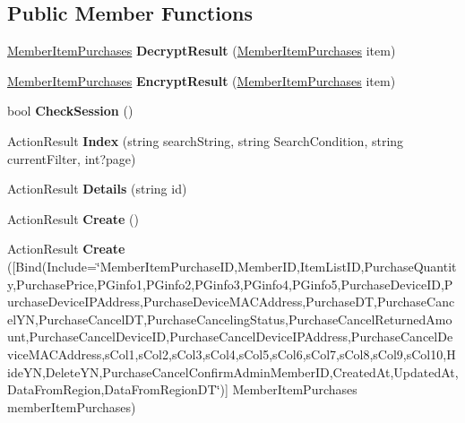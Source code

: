 \subsection*{Public Member Functions}
\begin{DoxyCompactItemize}
\item 
\hyperlink{a00141}{Member\+Item\+Purchases} {\bfseries Decrypt\+Result} (\hyperlink{a00141}{Member\+Item\+Purchases} item)\hypertarget{a00142_a8a84f0cff554dfb46c0c604d5e2d4ff2}{}\label{a00142_a8a84f0cff554dfb46c0c604d5e2d4ff2}

\item 
\hyperlink{a00141}{Member\+Item\+Purchases} {\bfseries Encrypt\+Result} (\hyperlink{a00141}{Member\+Item\+Purchases} item)\hypertarget{a00142_a3d84ac2ff6df91a2276f61ba6ce1f963}{}\label{a00142_a3d84ac2ff6df91a2276f61ba6ce1f963}

\item 
bool {\bfseries Check\+Session} ()\hypertarget{a00142_ad0ff421b4f6fc9e0780deb5a27a2150f}{}\label{a00142_ad0ff421b4f6fc9e0780deb5a27a2150f}

\item 
Action\+Result {\bfseries Index} (string search\+String, string Search\+Condition, string current\+Filter, int?page)\hypertarget{a00142_a44c72c4bebdec3f1987985421408a1a5}{}\label{a00142_a44c72c4bebdec3f1987985421408a1a5}

\item 
Action\+Result {\bfseries Details} (string id)\hypertarget{a00142_ab813724b3ac2a94f354fc1cdd143eda5}{}\label{a00142_ab813724b3ac2a94f354fc1cdd143eda5}

\item 
Action\+Result {\bfseries Create} ()\hypertarget{a00142_abaee8c1213576a897fda07a53f056bc9}{}\label{a00142_abaee8c1213576a897fda07a53f056bc9}

\item 
Action\+Result {\bfseries Create} (\mbox{[}Bind(Include=\char`\"{}Member\+Item\+Purchase\+ID,Member\+ID,Item\+List\+ID,Purchase\+Quantity,Purchase\+Price,P\+Ginfo1,P\+Ginfo2,P\+Ginfo3,P\+Ginfo4,P\+Ginfo5,Purchase\+Device\+ID,Purchase\+Device\+I\+P\+Address,Purchase\+Device\+M\+A\+C\+Address,Purchase\+DT,Purchase\+Cancel\+YN,Purchase\+Cancel\+DT,Purchase\+Canceling\+Status,Purchase\+Cancel\+Returned\+Amount,Purchase\+Cancel\+Device\+ID,Purchase\+Cancel\+Device\+I\+P\+Address,Purchase\+Cancel\+Device\+M\+A\+C\+Address,s\+Col1,s\+Col2,s\+Col3,s\+Col4,s\+Col5,s\+Col6,s\+Col7,s\+Col8,s\+Col9,s\+Col10,Hide\+YN,Delete\+YN,Purchase\+Cancel\+Confirm\+Admin\+Member\+ID,Created\+At,Updated\+At,Data\+From\+Region,Data\+From\+Region\+DT\char`\"{})\mbox{]} Member\+Item\+Purchases member\+Item\+Purchases)\hypertarget{a00142_aa2ba065524f7cccc9e80fbb4d5ebbfd3}{}\label{a00142_aa2ba065524f7cccc9e80fbb4d5ebbfd3}


\end{DoxyCompactItemize}
